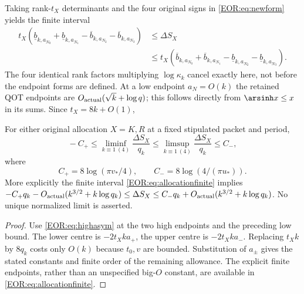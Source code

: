 \documentclass[11pt,a4paper]{article}
\begin{document}
Taking rank-$t_X$ determinants and the four original signs in
\eqref{EOR:eq:newform} yields the finite interval
\begin{equation}
\begin{split}
 t_X(\underline b_{k,a_{N_0}}+\underline b_{k,a_{N_1}}
     -\overline b_{k,a_{N_2}}-\overline b_{k,a_{N_3}})
 &\le\Delta S_X\\
 &\le
 t_X(\overline b_{k,a_{N_0}}+\overline b_{k,a_{N_1}}
     -\underline b_{k,a_{N_2}}-\underline b_{k,a_{N_3}}).
\end{split}\label{EOR:eq:allocationfinite}
\tag{EOR24}
\end{equation}
The four identical rank factors multiplying $\log\kappa_k$ cancel exactly here,
not before the endpoint forms are defined.
At a low endpoint $a_N=O(k)$ the retained QOT endpoints are
$O_{\rm actual}(\sqrt k+\log q)$; this follows directly from
$\arsinh x\le x$ in its sums. Since $t_X=8k+O(1)$,
\begin{QOTtheorem}
For either original allocation $X=K,R$ at a fixed stipulated packet and period,
\begin{equation}
 \boxed{\quad
 -C_+\le\liminf_{k\equiv1\ (4)}\frac{\Delta S_X}{q_k}
 \le\limsup_{k\equiv1\ (4)}\frac{\Delta S_X}{q_k}\le C_-,
 \quad}\label{EOR:eq:alloclimit}
\tag{EOR25}
\end{equation}
where
\begin{equation}
 C_+=8\log(\pi v_*/4),\qquad
 C_-=8\log(4/(\pi u_*)).
 \label{EOR:eq:Cpm}
\tag{EOR26}
\end{equation}
More explicitly the finite interval \eqref{EOR:eq:allocationfinite} implies
$-C_+q_k-O_{\rm actual}(k^{3/2}+k\log q_k)\le\Delta S_X
\le C_-q_k+O_{\rm actual}(k^{3/2}+k\log q_k)$.
No unique normalized limit is asserted.
\end{QOTtheorem}
\begin{proof}
Use \eqref{EOR:eq:highasym} at the two high endpoints and the preceding low bound.
The lower centre is $-2t_Xka_+$, the upper centre is $-2t_Xka_-$.
Replacing $t_Xk$ by $8q_k$ costs only $O(k)$ because $t_0,v$ are bounded.
Substitution of $a_\pm$ gives the stated constants and finite order of the
remaining allowance. The explicit finite endpoints, rather than an unspecified
big-$O$ constant, are available in \eqref{EOR:eq:allocationfinite}.
\end{proof}
\end{document}
